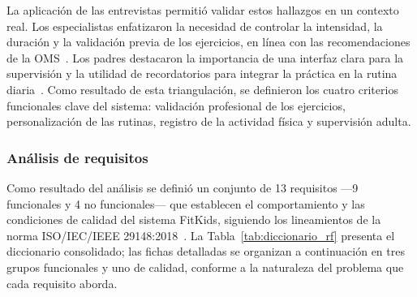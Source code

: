 				La aplicación de las entrevistas permitió validar estos hallazgos en un contexto real. Los especialistas enfatizaron la necesidad de controlar la intensidad, la duración y la validación previa de los ejercicios, en línea con las recomendaciones de la OMS~\cite{Bull2020}. Los padres destacaron la importancia de una interfaz clara para la supervisión y la utilidad de recordatorios para integrar la práctica en la rutina diaria~\cite{VegaDiaz2023,Yao2015}. Como resultado de esta triangulación, se definieron los cuatro criterios funcionales clave del sistema: validación profesional de los ejercicios, personalización de las rutinas, registro de la actividad física y supervisión adulta.
				
				\subsubsection{Análisis de requisitos}
					Como resultado del análisis se definió un conjunto de 13 requisitos ---9 funcionales y 4 no funcionales--- que establecen el comportamiento y las condiciones de calidad del sistema FitKids, siguiendo los lineamientos de la norma ISO/IEC/IEEE 29148:2018~\cite{Fowler2002}. La Tabla~\ref{tab:diccionario_rf} presenta el diccionario consolidado; las fichas detalladas se organizan a continuación en tres grupos funcionales y uno de calidad, conforme a la naturaleza del problema que cada requisito aborda.
					
